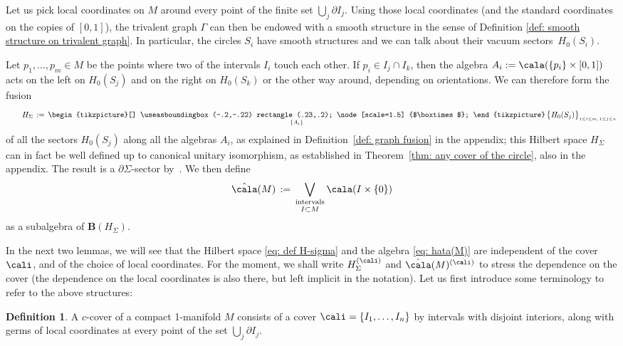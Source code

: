 \documentclass[a4paper,10pt,leqno]{amsart}
\newcommand{\coritsapartialSigmasector}{Cor.~3.31}
\newcommand{\bfB}{{\mathbf B}}   \newcommand{\sfB}{{\mathsf{B}}}
\newcommand{\tikzmath}[2][]
     {\vcenter{\hbox{\begin{tikzpicture}[#1]#2
                     \end{tikzpicture}}}
     }
\theoremstyle{plain}
\theoremstyle{definition}
\newtheorem{definition}[theorem]{Definition}
\theoremstyle{remark}
\DeclareMathOperator\bigboxtimes{\tikzmath{
\useasboundingbox (-.2,-.22) rectangle (.23,.2);
\node[scale=1.5] {$\boxtimes$};}}
\begin{document}
Let us pick local coordinates on $M$ around every point of the finite set $\bigcup_j\partial I_j$.
Using those local coordinates (and the standard coordinates on the copies of $[0,1]$), the trivalent graph $\Gamma$ can then be endowed with a smooth structure in the sense of Definition \ref{def: smooth structure on trivalent graph}.
In particular, the circles $S_i$ have smooth structures and we can talk about their vacuum sectors~$H_0(S_i)$.

Let $p_1,\ldots,p_m\in M$ be the points where two of the intervals $I_i$ touch each other.
If $p_i\in I_j\cap I_k$, then the algebra $A_i:=\cala(\{p_i\}\times [0,1])$ acts on the left on $H_0(S_j)$ and on the right on $H_0(S_k)$
or the other way around, depending on orientations.
We can therefore form the fusion 
\begin{equation}\label{eq: def H-sigma}
\qquad H_\Sigma\,:=\,\bigboxtimes_{\{A_i\}}\big\{H_0(S_j)\big\}_{\scriptscriptstyle 1\le i\le m,\, 1\le j\le n}
\end{equation}
of all the sectors $H_0(S_j)$ along all the algebras $A_i$, as explained in Definition~\ref{def: graph fusion} in the appendix; this Hilbert space $H_\Sigma$ can in fact be well defined up to canonical unitary isomorphism, as established in Theorem~\ref{thm: any cover of the circle}, also in the appendix.
The result is a $\partial \Sigma$-sector 
by~\cite[\coritsapartialSigmasector]{BDH(nets)}.
We then define
\begin{equation}\label{eq: hata(M)}
\hat\cala(M)\,:=\, \bigvee_{\substack{\text{intervals} \\ {}^{\phantom{+}}I\subset M{}^{\phantom{+}}}} \cala(I\times \{0\})
\end{equation}
as a subalgebra of $\bfB(H_\Sigma)$.

In the next two lemmas, we will see that the Hilbert space \eqref{eq: def H-sigma} and the algebra \eqref{eq: hata(M)} are independent of the cover $\cali$,
and of the choice of local coordinates.
For the moment, we shall write $H_\Sigma^{(\cali)}$ and $\hat\cala(M)^{(\cali)}$ to stress the dependence on the cover 
(the dependence on the local coordinates is also there, but left implicit in the notation).
Let us first introduce some terminology to refer to the above structures:

\begin{definition}\label{def: c-cover}
A $c$-cover of a compact 1-manifold $M$ consists of a cover $\cali=\{I_1,\ldots,I_n\}$ by intervals with disjoint interiors,
along with germs of local coordinates at every point of the set $\bigcup_j\partial I_j$.
\end{definition}
\end{document}
